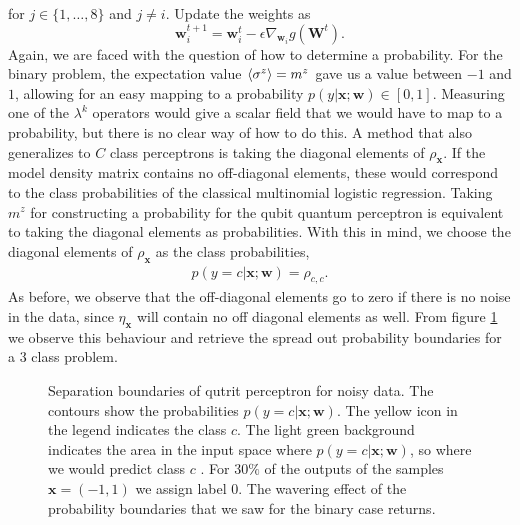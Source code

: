 for $j\in\{1,\ldots,8\}$ and $j\neq i$. Update the weights as
\begin{equation*}
    \mathbf{w}_i^{t+1} = \mathbf{w}_i^{t} - \epsilon \nabla_{\mathbf{w}_i} g(\mathbf{W}^t).
\end{equation*}
Again, we are faced with the question of how to determine a probability. For the binary problem, the expectation value $\expval{\sigma^z}=m^z$ gave us a value between $-1$ and $1$, allowing for an easy mapping to a probability $p(y|\mathbf{x};\mathbf{w})\in[0,1]$. Measuring one of the $\lambda^k$ operators would give a scalar field that we would have to map to a probability, but there is no clear way of how to do this. A method that also generalizes to $C$ class perceptrons is taking the diagonal elements of $\rho_\mathbf{x}$. If the model density matrix contains no off-diagonal elements, these would correspond to the class probabilities of the classical multinomial logistic regression. Taking $m^z$ for constructing a probability for the qubit quantum perceptron is equivalent to taking the diagonal elements as probabilities. With this in mind, we choose the diagonal elements of $\rho_\mathbf{x}$ as the class probabilities,
\begin{align*}
    p(y=c|\mathbf{x};\mathbf{w}) = \rho_{c,c}.
\end{align*}
As before, we observe that the off-diagonal elements go to zero if there is no noise in the data, since $\eta_\mathbf{x}$ will contain no off diagonal elements as well. From figure \ref{fig:qm_mn_r} we observe this behaviour and retrieve the spread out probability boundaries for a 3 class problem.

\begin{figure}[htb!]
    \centering
    \caption{Separation boundaries of qutrit perceptron for noisy data. The contours show the probabilities $p(y=c|\mathbf{x};\mathbf{w})$. The yellow icon in the legend indicates the class $c$. The light green background indicates the area in the input space where $p(y=c|\mathbf{x};\mathbf{w})$, so where we would predict class $c$ . For $30\%$ of the outputs of the samples $\mathbf{x} = (-1,1)$ we assign label $0$. The wavering effect of the probability boundaries that we saw for the binary case returns.}
    \label{fig:qm_mn_r}
\end{figure}

